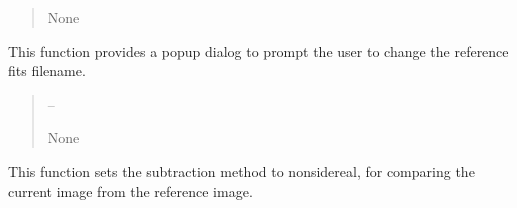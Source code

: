 \documentclass[letterpaper,11pt,english]{sphinxmanual}
\begin{document}
\begin{savenotes}
\begin{fulllineitems}
\begin{savenotes}
\begin{fulllineitems}
\begin{quote}
\begin{description}
\sphinxAtStartPar
None

\end{description}\end{quote}

\end{fulllineitems}\end{savenotes}


\begin{savenotes}\begin{fulllineitems}
\label{\detokenize{code/opihiexarata.gui.selector:opihiexarata.gui.selector.TargetSelectorWindow.__connect_push_button_change_reference_filename}}
\pysigstartsignatures
{}
\pysigstopsignatures
\sphinxAtStartPar
This function provides a popup dialog to prompt the user to change
the reference fits filename.
\begin{quote}\begin{description}
\sphinxAtStartPar
{} – 

\sphinxAtStartPar
None

\end{description}\end{quote}

\end{fulllineitems}\end{savenotes}


\begin{savenotes}\begin{fulllineitems}
\label{\detokenize{code/opihiexarata.gui.selector:opihiexarata.gui.selector.TargetSelectorWindow.__connect_push_button_mode_non_sidereal}}
\pysigstartsignatures
{}
\pysigstopsignatures
\sphinxAtStartPar
This function sets the subtraction method to non\sphinxhyphen{}sidereal, for
comparing the current image from the reference image.


\end{fulllineitems}
\end{savenotes}
\end{fulllineitems}
\end{savenotes}
\end{document}
